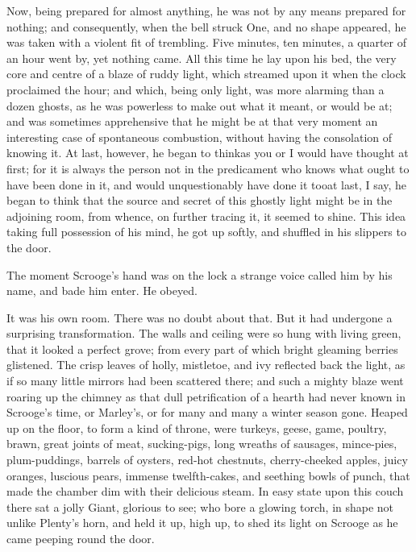 \documentclass[paper=5.5in:8.5in,BCOR=10mm,twoside,DIV=15,12pt,usegeometry,openany]{scrbook} %
\begin{document}
Now, being prepared for almost anything, he was not by any means prepared for nothing; and consequently, when the bell struck One, and no shape appeared, he was taken with a violent fit of trembling. Five minutes, ten minutes, a quarter of an hour went by, yet nothing came. All this time he lay upon his bed, the very core and centre of a blaze of ruddy light, which streamed upon it when the clock proclaimed the hour; and which, being only light, was more alarming than a dozen ghosts, as he was powerless to make out what it meant, or would be at; and was sometimes apprehensive that he might be at that very moment an interesting case of spontaneous combustion, without having the consolation of knowing it. At last, however, he began to think\textemdash as you or I would have thought at first; for it is always the person not in the predicament who knows what ought to have been done in it, and would unquestionably have done it too\textemdash at last, I say, he began to think that the source and secret of this ghostly light might be in the adjoining room, from whence, on further tracing it, it seemed to shine. This idea taking full possession of his mind, he got up softly, and shuffled in his slippers to the door.

The moment Scrooge's hand was on the lock a strange voice called him by his name, and bade him enter. He obeyed.

It was his own room. There was no doubt about that. But it had undergone a surprising transformation. The walls and ceiling were so hung with living green, that it looked a perfect grove; from every part of which bright gleaming berries glistened. The crisp leaves of holly, mistletoe, and ivy reflected back the light, as if so many little mirrors had been scattered there; and such a mighty blaze went roaring up the chimney as that dull petrification of a hearth had never known in Scrooge's time, or Marley's, or for many and many a winter season gone. Heaped up on the floor, to form a kind of throne, were turkeys, geese, game, poultry, brawn, great joints of meat, sucking-pigs, long wreaths of sausages, mince-pies, plum-puddings, barrels of oysters, red-hot chestnuts, cherry-cheeked apples, juicy oranges, luscious pears, immense twelfth-cakes, and seething bowls of punch, that made the chamber dim with their delicious steam. In easy state upon this couch there sat a jolly Giant, glorious to see; who bore a glowing torch, in shape not unlike Plenty's horn, and held it up, high up, to shed its light on Scrooge as he came peeping round the door.
\end{document}
